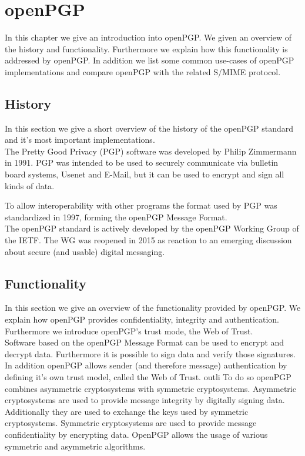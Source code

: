 \chapter{openPGP} \label{chapter:openpgp}

In this chapter we give an introduction into openPGP. We given an overview of the history and functionality. Furthermore we explain how this functionality is addressed by openPGP. In addition we list some common use-cases of openPGP implementations and compare openPGP with the related S/MIME protocol. 


\section{History}  \label{section:openpgp:history}

In this section we give a short overview of the history of the openPGP standard and it's most important implementations. \\


The Pretty Good Privacy (PGP) software was developed by Philip Zimmermann in 1991.  PGP was intended to be used to securely communicate via bulletin board systems, Usenet and E-Mail, but it can be used to encrypt and sign all kinds of data.

To allow interoperability with other programs the format used by PGP was standardized in 1997, forming the openPGP Message Format. \\


The openPGP standard is actively developed by the openPGP Working Group of the IETF. The WG was reopened in 2015 as reaction to an emerging discussion about secure (and usable) digital messaging.

\section{Functionality} \label{section:openpgp:functionality}

In this section we give an overview of the functionality provided by openPGP. We explain how openPGP provides confidentiality, integrity
and authentication. Furthermore we introduce openPGP's trust mode, the Web of Trust.  \\


Software based on the openPGP Message Format can be used to encrypt and decrypt data. Furthermore it is possible to sign data and verify those signatures. In addition openPGP allows sender (and therefore message) authentication by defining it's own trust model, called the Web of Trust. 
outli
To do so openPGP combines asymmetric cryptosystems with symmetric cryptosystems. Asymmetric cryptosystems are used to provide message integrity by digitally signing data. Additionally they are used to exchange the keys used by symmetric cryptosystems. Symmetric cryptosystems are used to provide message confidentiality by encrypting data. OpenPGP allows the usage of various symmetric and asymmetric algorithms. \\


